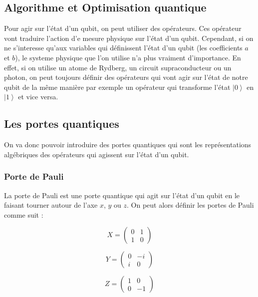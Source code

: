 \documentclass{article}
\begin{document}
\begin{multicols}{2}
\section{Algorithme et Optimisation quantique}

Pour agir sur l'état d'un qubit, on peut utiliser des opérateurs.
Ces opérateur vont traduire l'action d'e mesure physique sur l'état d'un qubit.
Cependant, si on ne s'interesse qu'aux variables qui définissent l'état d'un qubit (les coefficients $a$ et $b$), le systeme physique que l'on utilise n'a plus vraiment d'importance.
En effet, si on utilise un atome de Rydberg, un circuit supraconducteur ou un photon, on peut toujours définir des opérateurs qui vont agir sur l'état de notre qubit de la même manière par exemple un opérateur qui transforme l'état $\left|0\right>$ en $\left|1\right>$ et vice versa.


\subsection{Les portes quantiques}

On va donc pouvoir introduire des portes quantiques qui sont les représentations algébriques des opérateurs qui agissent sur l'état d'un qubit.

\subsubsection{Porte de Pauli}

La porte de Pauli est une porte quantique qui agit sur l'état d'un qubit en le faisant tourner autour de l'axe $x$, $y$ ou $z$.
On peut alors définir les portes de Pauli comme suit :

\begin{equation}
    X = \begin{pmatrix} 0 & 1 \\ 1 & 0 \end{pmatrix}
\end{equation}

\begin{equation}
    Y = \begin{pmatrix} 0 & -i \\ i & 0 \end{pmatrix}
\end{equation}


\begin{equation}
    Z = \begin{pmatrix} 1 & 0 \\ 0 & -1 \end{pmatrix}
\end{equation}


\end{multicols}
\end{document}
